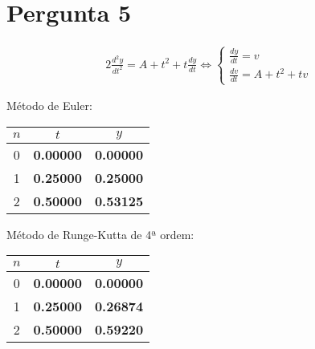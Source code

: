 {\section{Pergunta 5}
\begin{alignat*}{2}
    \frac{d^2y}{dt^2}=A+t^2+t\frac{dy}{dt} \iff
    \begin{cases}
        \frac{dy}{dt} = v \\
        \frac{dv}{dt} = A+t^2+tv
    \end{cases}
\end{alignat*}

\begin{center}
    \begin{minipage}[c]{0.5\textwidth}
        \begin{center}
            Método de Euler:\\
            \begin{tabular}{c | c c}
                $n$ & $t$ & $y$ \\ \hline
                0 &      \textbf{0.00000} & \textbf{0.00000} \\
                1 &      \textbf{0.25000} & \textbf{0.25000} \\
                2 &      \textbf{0.50000} & \textbf{0.53125}
            \end{tabular}
        \end{center}
    \end{minipage}%
    \begin{minipage}[c]{0.5\textwidth}
        \begin{center}
            Método de Runge-Kutta de 4ª ordem:\\
            \begin{tabular}{c | c c}
                $n$ & $t$ & $y$ \\ \hline
                0 &      \textbf{0.00000} & \textbf{0.00000} \\
                1 &      \textbf{0.25000} & \textbf{0.26874} \\
                2 &      \textbf{0.50000} & \textbf{0.59220}
            \end{tabular}
        \end{center}
    \end{minipage}
\end{center}

}
